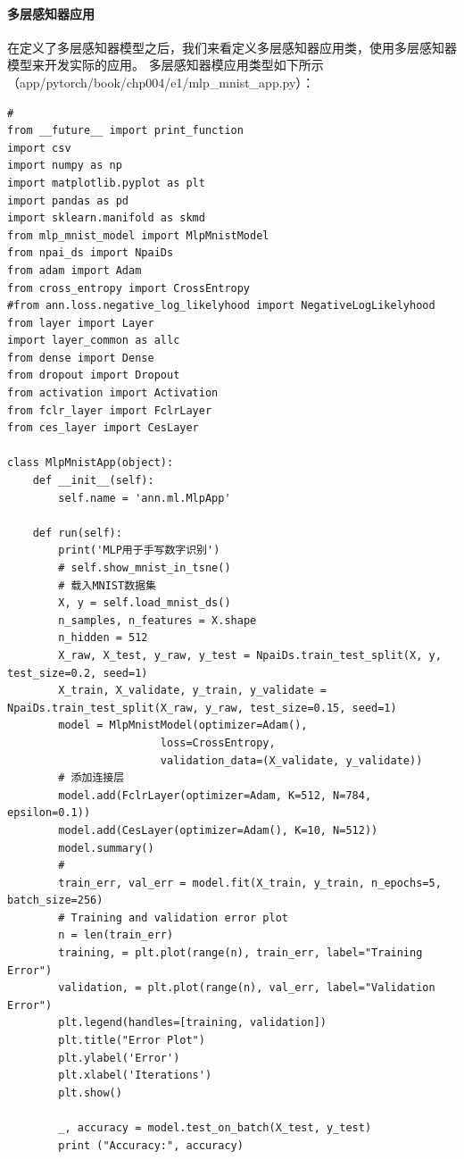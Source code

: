 \documentclass[UTF8]{article}
\begin{document}
\paragraph{多层感知器应用}
在定义了多层感知器模型之后，我们来看定义多层感知器应用类，使用多层感知器模型来开发实际的应用。\newline
多层感知器模应用类型如下所示（app/pytorch/book/chp004/e1/mlp\_mnist\_app.py）：
\begin{lstlisting}
#
from __future__ import print_function
import csv
import numpy as np
import matplotlib.pyplot as plt
import pandas as pd
import sklearn.manifold as skmd
from mlp_mnist_model import MlpMnistModel
from npai_ds import NpaiDs
from adam import Adam
from cross_entropy import CrossEntropy
#from ann.loss.negative_log_likelyhood import NegativeLogLikelyhood
from layer import Layer
import layer_common as allc
from dense import Dense
from dropout import Dropout
from activation import Activation
from fclr_layer import FclrLayer
from ces_layer import CesLayer

class MlpMnistApp(object):
    def __init__(self):
        self.name = 'ann.ml.MlpApp'
        
    def run(self):
        print('MLP用于手写数字识别')
        # self.show_mnist_in_tsne()
        # 载入MNIST数据集
        X, y = self.load_mnist_ds()
        n_samples, n_features = X.shape
        n_hidden = 512
        X_raw, X_test, y_raw, y_test = NpaiDs.train_test_split(X, y, test_size=0.2, seed=1)
        X_train, X_validate, y_train, y_validate = NpaiDs.train_test_split(X_raw, y_raw, test_size=0.15, seed=1)
        model = MlpMnistModel(optimizer=Adam(),
                        loss=CrossEntropy,
                        validation_data=(X_validate, y_validate))
        # 添加连接层
        model.add(FclrLayer(optimizer=Adam, K=512, N=784, epsilon=0.1))
        model.add(CesLayer(optimizer=Adam(), K=10, N=512))
        model.summary()
        #
        train_err, val_err = model.fit(X_train, y_train, n_epochs=5, batch_size=256)
        # Training and validation error plot
        n = len(train_err)
        training, = plt.plot(range(n), train_err, label="Training Error")
        validation, = plt.plot(range(n), val_err, label="Validation Error")
        plt.legend(handles=[training, validation])
        plt.title("Error Plot")
        plt.ylabel('Error')
        plt.xlabel('Iterations')
        plt.show()

        _, accuracy = model.test_on_batch(X_test, y_test)
        print ("Accuracy:", accuracy)


\end{lstlisting}
\end{document}
